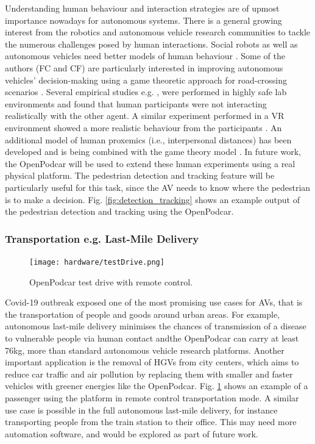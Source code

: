 \documentclass[a4paper]{article}
\begin{document}
	Understanding human behaviour and interaction strategies are of upmost importance nowadays for autonomous systems. There is a general growing interest from the robotics and autonomous vehicle research communities to tackle the numerous challenges posed by human interactions. Social robots as well as autonomous vehicles need better models of human behaviour \cite{camara2020pedestrian, camara2020pedestriana}. Some of the authors (FC and CF) are particularly interested in improving autonomous vehicles' decision-making using a game theoretic approach for road-crossing scenarios \cite{fox2018when}. Several empirical studies e.g. \cite{camara2018towards, camara2020continuous, camara2018empirical}, were performed in highly safe lab environments and found that human participants were not interacting realistically with the other agent. A similar experiment performed in a VR environment showed a more realistic behaviour from the participants \cite{camara2021evaluating, camara2019towards}. An additional model of human proxemics (i.e., interpersonal distances) has been developed and is being combined with the game theory model \cite{camara2020space, camara2022extending}. In future work, the OpenPodcar will be used to extend these human experiments using a real physical platform. The pedestrian detection and tracking feature will be particularly useful for this task, since the AV needs to know where the pedestrian is to make a decision. Fig. \ref{fig:detection_tracking} shows an example output of the pedestrian detection and tracking using the OpenPodcar.
	
	
	\subsubsection{Transportation e.g. Last-Mile Delivery}
	
	\begin{figure}
		\centering
		\texttt{[image: hardware/testDrive.png]}
		\caption{OpenPodcar test drive with remote control.}
		\label{fig:testDrive}
	\end{figure}
	
	Covid-19 outbreak exposed one of the most promising use cases for AVs, that is the transportation of people and goods around urban areas. For example, autonomous last-mile delivery minimises the chances of transmission of a disease to vulnerable people via human contact andthe OpenPodcar can carry at least 76kg, more than standard autonomous vehicle research platforms. Another important application is the removal of HGVs from city centers, which aims to reduce car traffic and air pollution by replacing them with smaller and faster vehicles with greener energies like the OpenPodcar. Fig. \ref{fig:testDrive} shows an example of a passenger using the platform in remote control transportation mode. A similar use case is possible in the full autonomous last-mile delivery, for instance transporting people from the train station to their office. This may need more automation software, and would be explored as part of future work. 
	
\end{document}
